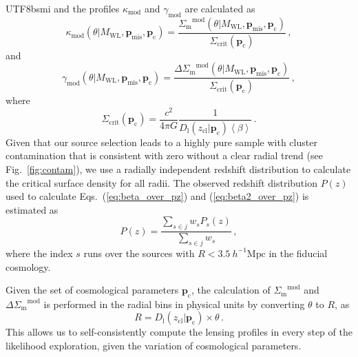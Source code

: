 \documentclass[longauth]{aa}
\newcommand{\Mpch}{\ensuremath{h^{-1}\mathrm{Mpc}}}
\newcommand{\redshift}{\ensuremath{z}}
\newcommand{\zcl}{\ensuremath{z_{\mathrm{cl}}}}
\newcommand{\lensingw}{\ensuremath{w}}
\newcommand{\deltaSigma}{\ensuremath{\Delta{\Sigma}_{\mathrm{m}}}}
\newcommand{\Sigmam}{\ensuremath{{\Sigma}_{\mathrm{m}}}}
\newcommand{\Mwl}{\ensuremath{M_{\mathrm{WL}}}}
\newcommand{\sigmacrit}{\ensuremath{\Sigma_{\mathrm{crit}}}}
\newcommand{\lensingeff}{\ensuremath{\beta}}
\begin{document}
\begin{CJK*}{UTF8}{bsmi}
%
and the profiles ${\kappa}_{\mathrm{mod}}$ and ${\gamma}_{\mathrm{mod}}$ are calculated as
%
\begin{equation}
\label{eq:modelSigma}
{\kappa}_{\mathrm{mod}}
\left(
\theta|\Mwl, \mathbf{p}_{\mathrm{mis}}, \mathbf{p}_{\mathrm{c}}
\right) = 
\frac{
\Sigmam^{\mathrm{mod}}
\left(
\theta|\Mwl, \mathbf{p}_{\mathrm{mis}}, \mathbf{p}_{\mathrm{c}}
\right)
}
{
{\sigmacrit}
\left(
\mathbf{p}_{\mathrm{c}}
\right)
}
\, ,
\end{equation}
%
and
%
\begin{equation}
\label{eq:modeldeltaSigma}
{\gamma}_{\mathrm{mod}}
\left(
\theta|\Mwl, \mathbf{p}_{\mathrm{mis}}, \mathbf{p}_{\mathrm{c}}
\right) = 
\frac{
\deltaSigma^{\mathrm{mod}}
\left(
\theta|\Mwl, \mathbf{p}_{\mathrm{mis}}, \mathbf{p}_{\mathrm{c}}
\right)
}
{
{\sigmacrit}
\left(
\mathbf{p}_{\mathrm{c}}
\right)
}
\, ,
\end{equation}
%
where
%
\begin{equation}
\label{eq:modelsigmacrit}
\sigmacrit
\left(
\mathbf{p}_{\mathrm{c}}
\right)
= 
\frac{c^2}{4\pi G}\frac{
1
}{
D_{\mathrm{l}}
\left(
\zcl | \mathbf{p}_{\mathrm{c}}
\right) 
\left\langle
\lensingeff
\right\rangle
}
\, .
\end{equation}
%
Given that our source selection leads to a highly pure sample with cluster contamination that is consistent with zero without a clear radial trend (see Fig.~\ref{fig:contam}), we use a radially independent redshift distribution to calculate the critical surface density for all radii.
The observed redshift distribution $P\left(\redshift\right)$ used to calculate Eqs.~(\ref{eq:beta_over_pz}) and (\ref{eq:beta2_over_pz}) is estimated as
%
\begin{equation}
\label{eq:wpzbar}
P
\left(\redshift\right)
 = 
\frac{
\sum\limits_{s\in j } {\lensingw}_{s} P_{s}(\redshift)
}{
\sum\limits_{s\in j } {\lensingw}_{s}
} \, ,
\end{equation}
%
where the index $s$ runs over the sources with $R<3.5~\Mpch$ in the fiducial cosmology.


Given the set of cosmological parameters $\mathbf{p}_{\mathrm{c}}$, the calculation of $\Sigmam^{\mathrm{mod}}$ and $\deltaSigma^{\mathrm{mod}}$ is performed in the radial bins in physical units by converting $\theta$ to $R$, as
%
\begin{equation}
\label{eq:redshift-distance-relation}
R = D_{\mathrm{l}}\left(\zcl| \mathbf{p}_{\mathrm{c}}\right) \times \theta \, .
\end{equation}
%
This allows us to self-consistently compute the lensing profiles in every step of the likelihood exploration, given the variation of cosmological parameters.


\end{CJK*}
\end{document}
